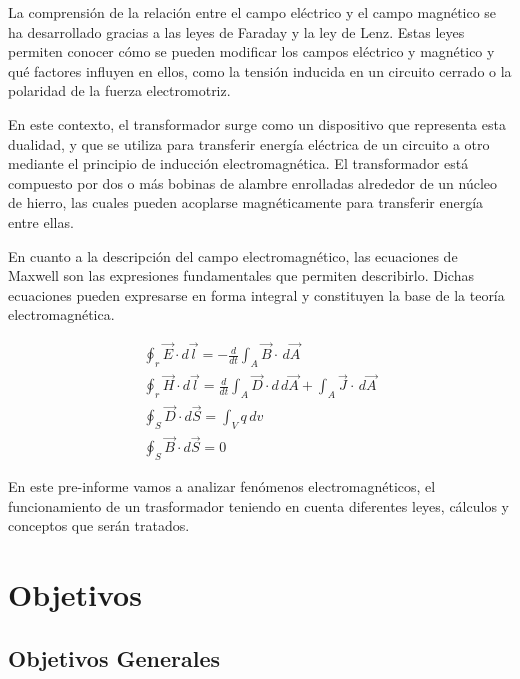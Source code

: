 \documentclass[twocolumn, 12pt]{article}
\begin{document}
La comprensión de la relación entre el campo eléctrico y el
campo magnético se ha desarrollado gracias a las leyes de
Faraday y la ley de Lenz. Estas leyes permiten conocer cómo
se pueden modificar los campos eléctrico y magnético y qué
factores influyen en ellos, como la tensión inducida en un
circuito cerrado o la polaridad de la fuerza electromotriz.

En este contexto, el transformador surge como un
dispositivo que representa esta dualidad, y que se utiliza
para transferir energía eléctrica de un circuito a otro
mediante el principio de inducción electromagnética. El
transformador está compuesto por dos o más bobinas de
alambre enrolladas alrededor de un núcleo de hierro, las
cuales pueden acoplarse magnéticamente para transferir
energía entre ellas.

En cuanto a la descripción del campo electromagnético, las
ecuaciones de Maxwell son las expresiones fundamentales que
permiten describirlo. Dichas ecuaciones pueden expresarse
en forma integral y constituyen la base de la teoría
electromagnética.

{\normalsize
\begin{equation}
	\begin{gathered}
		\oint_r \vec{E} \cdot d \vec{l} = - \frac{d}{dt} \int_{A}^{} \vec{B} \cdot \,d\vec{A} \\
		\oint_r \vec{H} \cdot d \vec{l} = \frac{d}{dt} \int_{A}^{} \vec{D} \cdot d \,d\vec{A} + \int_{A}^{} \vec{J} \cdot \,d\vec{A} \\
		\oint_S \vec{D} \cdot d \vec{S} = \int_{V}^{} q \,d{v} \\
		\oint_S \vec{B} \cdot d \vec{S} = 0
	\end{gathered}
\end{equation}
}

En este pre-informe vamos a analizar fenómenos
electromagnéticos, el funcionamiento de un trasformador
teniendo en cuenta diferentes leyes, cálculos y conceptos
que serán tratados.

\section{Objetivos}

\subsection*{Objetivos Generales}
\end{document}
